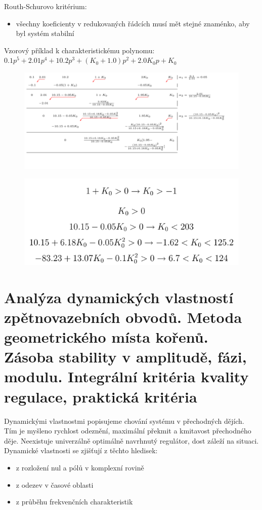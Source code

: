 Routh-Schurovo kritérium:

\begin{itemize}
    \item všechny koeficienty v redukovaných řádcích musí mět stejné znaménko, aby byl systém stabilní
\end{itemize}
Vzorový příklad k charakteristickému polynomu: $0.1p^5+2.01p^4+10.2p^3+(K_0+1.0)p^2+2.0K_0p+K_0$
\begin{figure}[H]
    \includegraphics*[scale = 1.2]{images/RouthSchur.png}
\end{figure}
\begin{figure}[H]
    \includegraphics*[scale = 1]{images/RouthSchur2.png}
\end{figure}




\section{Analýza dynamických vlastností zpětnovazebních obvodů. Metoda geometrického místa kořenů. Zásoba stability v amplitudě, fázi, modulu. Integrální kritéria kvality regulace, praktická kritéria}
Dynamickými vlastnostmi popisujeme chování systému v přechodných dějích. Tím je myšleno rychlost odeznění, maximální překmit a kmitavost přechodného děje. Neexistuje univerzálně optimálně navrhnutý regulátor, dost záleží na situaci.
Dynamické vlastnosti se zjišťují z těchto hledisek:
\begin{itemize}
    \item z rozložení nul a pólů v komplexní rovině
    \item z odezev v časové oblasti
    \item z průběhu frekvenčních charakteristik
\end{itemize}



